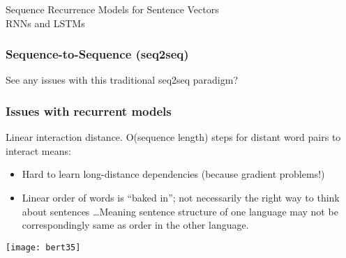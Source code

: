 





\begin{frame}[fragile]\frametitle{}
\begin{center}
{\Large Sequence Recurrence Models for Sentence Vectors\\ \small RNNs and LSTMs}
\end{center}
\end{frame}

\begin{frame}[fragile]\frametitle{Sequence-to-Sequence (seq2seq)}

\begin{center}
See any issues with this traditional seq2seq paradigm?
\end{center}	

\end{frame}

\begin{frame}[fragile]\frametitle{Issues with recurrent models}


Linear interaction distance. O(sequence length) steps for distant word pairs to interact means:

\begin{itemize}
\item Hard to learn long-distance dependencies (because gradient problems!)
\item Linear order of words is ``baked in''; not necessarily the  right way to think about sentences \ldots Meaning sentence structure of one language may not be correspondingly same as order in the other language.
\end{itemize}	 

\begin{center}
\texttt{[image: bert35]}
\end{center}	

 
\end{frame}

